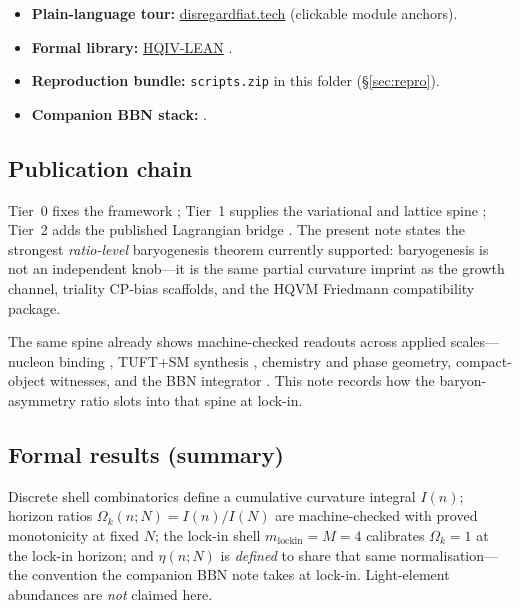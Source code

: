 \documentclass[11pt]{amsart}
\newcommand{\leanrepourl}{https://github.com/HQIV/hqiv-lean}
\newcommand{\programmeurl}{https://disregardfiat.tech}
\begin{document}
\begin{itemize}[leftmargin=2em,nosep]
\item \textbf{Plain-language tour:} \href{\programmeurl}{disregardfiat.tech}
  (clickable module anchors).
\item \textbf{Formal library:} \href{\leanrepourl}{HQIV-LEAN}
  \cite{hqiv-lean}.
\item \textbf{Reproduction bundle:} \texttt{scripts.zip} in this folder
  (\S\ref{sec:repro}).
\item \textbf{Companion BBN stack:} \cite{hqiv-bbn-paper}.
\end{itemize}

\subsection{Publication chain}
Tier~0 fixes the framework
\cite{ettinger2026hqiv,hqiv-lightcone-paper,hqiv-so8-paper}; Tier~1
supplies the variational and lattice spine
\cite{hqiv-3d-growth-paper,hqiv-oct-action-paper,hqiv-kirchhoff-paper,hqiv-thermo-arrow-paper};
Tier~2 adds the published Lagrangian bridge
\cite{hqiv-tuft-sm-lagrangian-paper}. The present note states the
strongest \emph{ratio-level} baryogenesis theorem currently supported:
baryogenesis is not an independent knob---it is the same partial
curvature imprint as the growth channel, triality CP-bias scaffolds, and
the HQVM Friedmann compatibility package.

The same spine already shows machine-checked readouts across applied
scales---nucleon binding \cite{hqiv-nucleon-binding-paper}, TUFT+SM
synthesis \cite{hqiv-tuft-sm-lagrangian-paper}, chemistry and phase
geometry, compact-object witnesses, and the BBN integrator
\cite{hqiv-bbn-paper}. This note records how the baryon-asymmetry ratio
slots into that spine at lock-in.

\subsection{Formal results (summary)}
Discrete shell combinatorics define a cumulative curvature integral
$I(n)$; horizon ratios $\Omega_k(n;N)=I(n)/I(N)$ are machine-checked
with proved monotonicity at fixed $N$; the lock-in shell
$m_{\mathrm{lockin}}=M=4$ calibrates $\Omega_k=1$ at the lock-in
horizon; and $\eta(n;N)$ is \emph{defined} to share that same
normalisation---the convention the companion BBN note
\cite{hqiv-bbn-paper} takes at lock-in. Light-element abundances are
\emph{not} claimed here.
\end{document}

